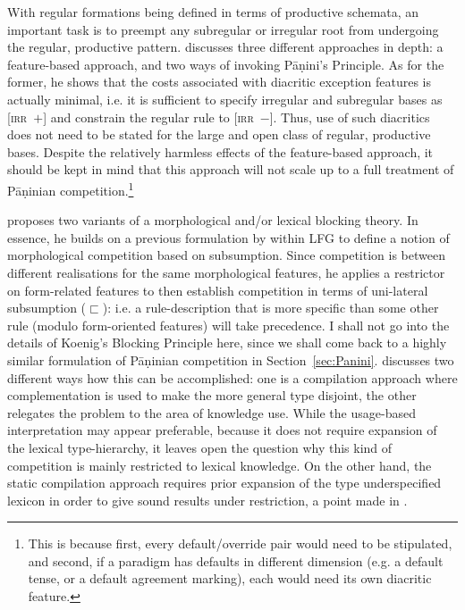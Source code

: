 \documentclass[output=paper
                ,modfonts
                ,nonflat
	        ,collection
	        ,collectionchapter
	        ,collectiontoclongg
 	        ,biblatex
                ,babelshorthands
                ,newtxmath
                ,draftmode
                ,colorlinks, citecolor=brown
] {langscibook}
\begin{document}
{With regular formations being defined in terms of productive schemata,
an important task is to preempt any subregular or irregular root from
undergoing the regular, productive pattern. \citet{Koenig99} discusses
three different approaches in depth: a feature-based approach, and two
ways of invoking Pāṇini's Principle. As for the former, he shows that
the costs associated with diacritic exception features is actually
minimal, i.e. it is sufficient to specify irregular and subregular
bases as \textsc{[irr~$+$]} and constrain the regular rule to
\textsc{[irr~$-$]}. Thus, use of such diacritics does not need to be
stated for the large and open class of regular, productive
bases. Despite the relatively harmless effects of the feature-based
approach, it should be kept in mind that this approach will not scale
up to a full treatment of Pāṇinian competition.\footnote{This is
  because first, every default/override pair would need to be
  stipulated, and second, if a paradigm has defaults in different
  dimension (e.g. a default tense, or a default agreement marking),
  each would need its own diacritic feature.}

\citet{Koenig99} proposes two variants of a morphological and/or lexical blocking
theory. In essence, he builds on a previous formulation by
\citet{Andrews90} within LFG to define a notion of morphological
competition based on subsumption. Since competition is between
different realisations for the same morphological features, he applies
a restrictor on form-related features to then establish competition in
terms of uni-lateral subsumption ($\sqsubset$): i.e. a
rule-description that is more specific than some other rule (modulo
form-oriented features) will take precedence. I shall not go into the
details of Koenig's Blocking Principle here, since we shall come back
to a highly similar formulation of Pāṇinian competition in
Section~\ref{sec:Panini}.  \citet{Koenig99} discusses two different
ways how this can be accomplished: one is a compilation approach where
complementation is used to make the more general type disjoint, the
other relegates the problem to the area of knowledge use. While the
usage-based interpretation may appear preferable, because it does not
require expansion of the lexical type-hierarchy, it leaves open the
question why this kind of competition is mainly restricted to lexical
knowledge. On the other hand, the static compilation approach requires
prior expansion of the type underspecified lexicon in order to give
sound results under restriction, a point made in
\citet{crysmann_b03book}.

}
\end{document}
